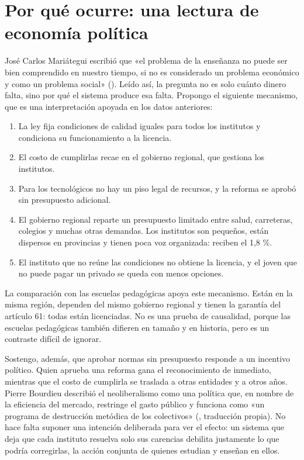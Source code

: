 \documentclass[
  jou,
  floatsintext,
  longtable,
  a4paper,
  nolmodern,
  notxfonts,
  notimes,
  12pt,
  colorlinks=true,linkcolor=blue,citecolor=blue,urlcolor=blue]{apa7}
\providecommand{\tightlist}{%
  \setlength{\itemsep}{0pt}\setlength{\parskip}{0pt}}
\begin{document}
\section{Por qué ocurre: una lectura de economía
política}\label{por-quuxe9-ocurre-una-lectura-de-economuxeda-poluxedtica}

José Carlos Mariátegui escribió que «el problema de la enseñanza no
puede ser bien comprendido en nuestro tiempo, si no es considerado un
problema económico y como un problema social»
(). Leído así, la pregunta no es solo cuánto dinero
falta, sino por qué el sistema produce esa falta. Propongo el siguiente
mecanismo, que es una interpretación apoyada en los datos anteriores:

\begin{enumerate}
\def\labelenumi{\arabic{enumi}.}
\tightlist
\item
  La ley fija condiciones de calidad iguales para todos los institutos y
  condiciona su funcionamiento a la licencia.
\item
  El costo de cumplirlas recae en el gobierno regional, que gestiona los
  institutos.
\item
  Para los tecnológicos no hay un piso legal de recursos, y la reforma
  se aprobó sin presupuesto adicional.
\item
  El gobierno regional reparte un presupuesto limitado entre salud,
  carreteras, colegios y muchas otras demandas. Los institutos son
  pequeños, están dispersos en provincias y tienen poca voz organizada:
  reciben el 1,8 \%.
\item
  El instituto que no reúne las condiciones no obtiene la licencia, y el
  joven que no puede pagar un privado se queda con menos opciones.
\end{enumerate}

La comparación con las escuelas pedagógicas apoya este mecanismo. Están
en la misma región, dependen del mismo gobierno regional y tienen la
garantía del artículo 61: todas están licenciadas. No es una prueba de
causalidad, porque las escuelas pedagógicas también difieren en tamaño y
en historia, pero es un contraste difícil de ignorar.

Sostengo, además, que aprobar normas sin presupuesto responde a un
incentivo político. Quien aprueba una reforma gana el reconocimiento de
inmediato, mientras que el costo de cumplirla se traslada a otras
entidades y a otros años. Pierre Bourdieu describió el neoliberalismo
como una política que, en nombre de la eficiencia del mercado, restringe
el gasto público y funciona como «un programa de destrucción metódica de
los colectivos»
(,
traducción propia). No hace falta suponer una intención deliberada para
ver el efecto: un sistema que deja que cada instituto resuelva solo sus
carencias debilita justamente lo que podría corregirlas, la acción
conjunta de quienes estudian y enseñan en ellos.
\end{document}
